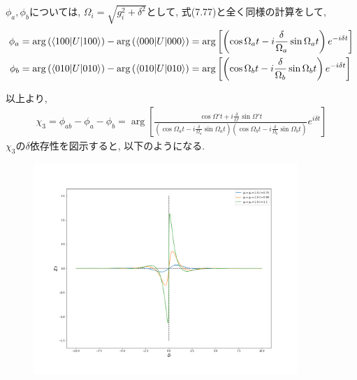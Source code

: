\begin{ex}
    $\phi_a, \phi_b$については, $\Omega_i = \sqrt{g_i^2 + \delta^2}$として, 式(7.77)と全く同様の計算をして,
    \begin{align*}
        \phi_a
         & = \arg\left( \braket{100|U|100}\right) - \arg\left( \braket{000|U|000}\right)
        =  \arg\left[ \left(\cos\Omega_a t - i \frac{\delta}{\Omega_a} \sin\Omega_a t\right) e^{- i \delta t} \right]
        \\
        \phi_b
         & = \arg\left( \braket{010|U|010}\right) - \arg\left( \braket{010|U|010}\right)
        =  \arg\left[
        \left(\cos\Omega_b t - i \frac{\delta}{\Omega_b} \sin\Omega_b t \right)e^{- i \delta t} \right]
    \end{align*}
    \par
    以上より,
    \begin{align*}
        \chi_3 = \phi_{ab} - \phi_a - \phi_b
        =
        \arg\left[
            \frac{\cos\Omega' t + i \frac{\delta}{\Omega'} \sin\Omega't }
            {\left(\cos\Omega_a t - i \frac{\delta}{\Omega_a} \sin\Omega_a t\right)
                \left(\cos\Omega_b t - i \frac{\delta}{\Omega_b} \sin\Omega_b t \right)}
            e^{i \delta t}
            \right]
    \end{align*}
    $\chi_3$の$\delta$依存性を図示すると, 以下のようになる.
    \begin{figure}[H]
        \begin{center}
            \includegraphics[width = 100mm]{./fig/ex7_21.png}
        \end{center}
    \end{figure}
\end{ex}

